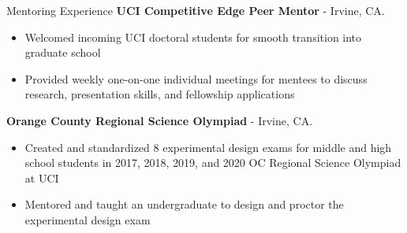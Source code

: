 \begin{rubric}{Mentoring Experience}
    \textbf{UCI Competitive Edge Peer Mentor} - Irvine, CA.
   \vspace{-0.5em}
   \begin{itemize}
   \itemsep-0.5em
   \item Welcomed incoming UCI doctoral students for smooth transition into graduate school
   \item Provided weekly one-on-one individual meetings for mentees to discuss research, presentation
     skills, and fellowship applications
     \vspace{-1em}
   \end{itemize}
    \textbf{Orange County Regional Science Olympiad} - Irvine, CA.
   \vspace{-0.5em}
   \begin{itemize}
   \itemsep-0.5em
   \item Created and standardized 8 experimental design exams for middle and high school students in
     2017, 2018, 2019, and 2020 OC Regional Science Olympiad at UCI
   \item Mentored and taught an undergraduate to design and proctor the experimental design exam
     \vspace{-1em}
   \end{itemize}
\end{rubric}

%
